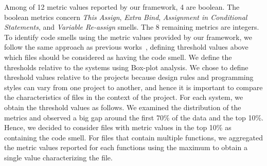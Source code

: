  Among of 12 metric values reported by our framework, 4 are boolean. The boolean metrics concern \emph{This Assign}, \emph{Extra Bind}, \emph{Assignment in Conditional Statements}, and \emph{Variable Re-assign} smells. The 8 remaining metrics are integers. To identify code smells using the metric values provided by our framework, we follow the same approach as previous works~\cite{saboury2017empirical,marinescu2004detection, mazinanian2016migrating}, defining threshold values above which files should be considered as having the code smell. We define the thresholds relative to the systems using Box-plot analysis. We chose to define threshold values relative to the projects because design rules and programming styles can vary from one project to another, and hence it is important to compare the characteristics of files in the context of the project. For each system, we obtain the threshold values as follows. We examined the distribution of the metrics and observed a big gap around the first 70\% of the data and the top 10\%. Hence, we decided to consider files with metric values in the top 10\% as containing the code smell. For files that contain multiple functions, we aggregated the metric values reported for each functions using the maximum to obtain a single value characterizing the file. %

%
%

